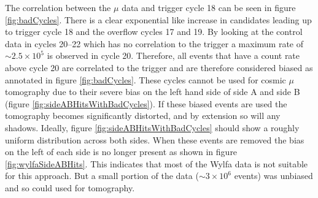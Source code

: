 
The correlation between the $\mu$ data and trigger cycle 18 can be seen in figure \ref{fig:badCycles}. There is a clear exponential like increase in candidates leading up to trigger cycle 18 and the overflow cycles 17 and 19. By looking at the control data in cycles 20--22 which has no correlation to the trigger a maximum rate of $\sim 2.5 \times 10^5$ is observed in cycle 20. Therefore, all events that have a count rate above cycle 20 are correlated to the trigger and are therefore considered biased as annotated in figure \ref{fig:badCycles}. These cycles cannot be used for cosmic $\mu$ tomography due to their severe bias on the left hand side of side A and side B (figure \ref{fig:sideABHitsWithBadCycles}). If these biased events are used the tomography becomes significantly distorted, and by extension so will any shadows. Ideally, figure \ref{fig:sideABHitsWithBadCycles} should show a roughly uniform distribution across both sides. When these events are removed the bias on the left of each side is no longer present as shown in figure \ref{fig:wylfaSideABHits}. This indicates that most of the Wylfa data is not suitable for this approach. But a small portion of the data ($\sim 3 \times 10^6$ events) was unbiased and so could used for tomography. 

